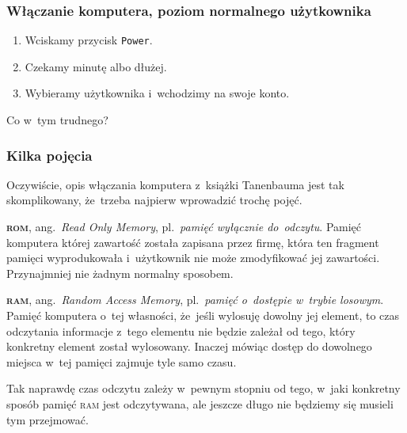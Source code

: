 \documentclass[10pt,t]{beamer}
\begin{document}
\begin{frame}
  \frametitle{Włączanie komputera, poziom normalnego użytkownika}


  \begin{enumerate}

  \item Wciskamy przycisk \texttt{Power}.

  \item Czekamy minutę albo dłużej.

  \item Wybieramy użytkownika i~wchodzimy na swoje konto.

  \end{enumerate}



  Co w~tym trudnego?

\end{frame}





\begin{frame}
  \frametitle{Kilka pojęcia}


  Oczywiście, opis włączania komputera z~książki Tanenbauma jest tak
  skomplikowany, że~trzeba najpierw wprowadzić trochę pojęć.

  \textbf{\textsc{rom}}, ang.~\textit{Read Only Memory}, pl.~\textit{pamięć
    wyłącznie do~odczytu}. Pamięć komputera której zawartość została
  zapisana przez firmę, która ten fragment pamięci wyprodukowała
  i~użytkownik nie może zmodyfikować jej zawartości. Przynajmniej nie żadnym
  normalny sposobem.

  \textbf{\textsc{ram}}, ang.~\textit{Random Access Memory},
  pl.~\textit{pamięć o~dostępie w~trybie losowym}. Pamięć komputera o~tej
  własności, że~jeśli wylosuję dowolny jej element, to czas odczytania
  informacje z~tego elementu nie będzie zależał od tego, który konkretny
  element został wylosowany. Inaczej mówiąc dostęp do dowolnego miejsca
  w~tej pamięci zajmuje tyle samo czasu.

  Tak naprawdę czas odczytu zależy w~pewnym stopniu od tego, w~jaki
  konkretny sposób pamięć \textsc{ram} jest odczytywana, ale jeszcze długo
  nie będziemy się musieli tym przejmować.

\end{frame}
\end{document}
